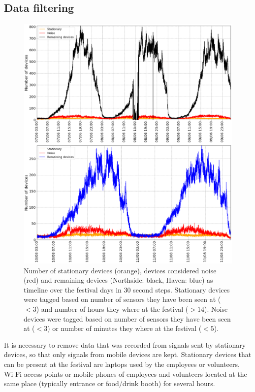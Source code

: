 \subsection{Data filtering} \label{sec:filtering}

\begin{figure}[tb]
  \centering
  \includegraphics[width=\linewidth]{figs/stationary_noise.png}
  \caption{Number of stationary devices (orange), devices considered noise (red) and remaining devices (Northside: black, Haven: blue) as timeline over the festival days in 30 second steps. Stationary devices were tagged based on number of sensors they have been seen at ($<3$) and number of hours they where at the festival ($>14$). Noise devices were tagged based on number of sensors they have been seen at ($<3$) or number of minutes they where at the festival ($<5$).}
  \label{fig:stationary_noise}
\end{figure}

It is necessary to remove data that was recorded from signals sent by stationary devices, so that only signals from mobile devices are kept. Stationary devices that can be present at the festival are laptops used by the employees or volunteers, Wi-Fi access points or mobile phones of employees and volunteers located at the same place (typically entrance or food/drink booth) for several hours.  

